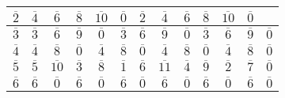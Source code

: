 \begin{solution}
\begin{center}
\begin{tabular}{|c||c|c|c|c|c|c|c|c|c|c|c|c|}
            \( \overline{2} \) &
            \( \overline{4} \) &
            \( \overline{6} \) &
            \( \overline{8} \) &
            \( \overline{10} \) &
            \( \overline{0} \) &
            \( \overline{2} \) &
            \( \overline{4} \) &
            \( \overline{6} \) &
            \( \overline{8} \) &
            \( \overline{10} \) &
            \( \overline{0} \) \\
            \hline
            \( \overline{3} \) &
            \( \overline{3} \) &
            \( \overline{6} \) &
            \( \overline{9} \) &
            \( \overline{0} \) &
            \( \overline{3} \) &
            \( \overline{6} \) &
            \( \overline{9} \) &
            \( \overline{0} \) &
            \( \overline{3} \) &
            \( \overline{6} \) &
            \( \overline{9} \) &
            \( \overline{0} \) \\
            \hline
            \( \overline{4} \) &
            \( \overline{4} \) &
            \( \overline{8} \) &
            \( \overline{0} \) &
            \( \overline{4} \) &
            \( \overline{8} \) &
            \( \overline{0} \) &
            \( \overline{4} \) &
            \( \overline{8} \) &
            \( \overline{0} \) &
            \( \overline{4} \) &
            \( \overline{8} \) &
            \( \overline{0} \) \\
            \hline
            \( \overline{5} \) &
            \( \overline{5} \) &
            \( \overline{10} \) &
            \( \overline{3} \) &
            \( \overline{8} \) &
            \( \overline{1} \) &
            \( \overline{6} \) &
            \( \overline{11} \) &
            \( \overline{4} \) &
            \( \overline{9} \) &
            \( \overline{2} \) &
            \( \overline{7} \) &
            \( \overline{0} \) \\
            \hline
            \( \overline{6} \) &
            \( \overline{6} \) &
            \( \overline{0} \) &
            \( \overline{6} \) &
            \( \overline{0} \) &
            \( \overline{6} \) &
            \( \overline{0} \) &
            \( \overline{6} \) &
            \( \overline{0} \) &
            \( \overline{6} \) &
            \( \overline{0} \) &
            \( \overline{6} \) &
            \( \overline{0} \) \\

\end{tabular}
\end{center}
\end{solution}
